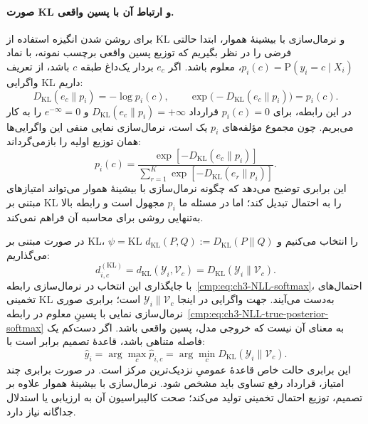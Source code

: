 \label{cmp:subsec:ch3-NLL-definition}
\paragraph{صورت KL و ارتباط آن با پسین واقعی.}
برای روشن شدن انگیزه استفاده از KL و نرمال‌سازی با بیشینهٔ هموار، ابتدا حالتی فرضی را در نظر بگیریم که توزیع پسین واقعی برچسب نمونه، با نماد $p_i(c)=\mathrm P(y_i=c\mid X_i)$، معلوم باشد. اگر $e_c$ بردار یک‌داغ طبقه $c$ باشد، از تعریف واگرایی KL داریم:
\begin{equation}\label{cmp:eq:ch3-NLL-true-posterior-KL}
D_{\mathrm{KL}}(e_c\|p_i)=-\log p_i(c),
\qquad
\exp\bigl(-D_{\mathrm{KL}}(e_c\|p_i)\bigr)=p_i(c).
\end{equation}
در این رابطه، برای $p_i(c)=0$ قرارداد $D_{\mathrm{KL}}(e_c\|p_i)=+\infty$ و $e^{-\infty}=0$ را به کار می‌بریم. چون مجموع مؤلفه‌های $p_i$ یک است، نرمال‌سازی نمایی منفی این واگرایی‌ها همان توزیع اولیه را بازمی‌گرداند:
\begin{equation}\label{cmp:eq:ch3-NLL-true-posterior-softmax}
p_i(c)=
\frac{\exp[-D_{\mathrm{KL}}(e_c\|p_i)]}
{\sum_{r=1}^{K}\exp[-D_{\mathrm{KL}}(e_r\|p_i)]}.
\end{equation}
این برابری توضیح می‌دهد که چگونه نرمال‌سازی با بیشینهٔ هموار می‌تواند امتیازهای مبتنی بر KL را به احتمال تبدیل کند؛ اما در مسئله ما $p_i$ مجهول است و رابطه بالا به‌تنهایی روشی برای محاسبه آن فراهم نمی‌کند.

در صورت مبتنی بر KL، $\psi=\mathrm{KL}$ را انتخاب می‌کنیم و
$d_{\mathrm{KL}}(P,Q):=D_{\mathrm{KL}}(P\|Q)$ می‌گذاریم:
\begin{equation}\label{cmp:eq:ch3-NLL-distance}
d_{i,c}^{(\mathrm{KL})}=d_{\mathrm{KL}}(\mathscr Y_i,\mathcal V_c)
=D_{\mathrm{KL}}(\mathscr Y_i\|\mathcal V_c).
\end{equation}
با جایگذاری این انتخاب در نرمال‌سازی
رابطه~\eqref{cmp:eq:ch3-NLL-softmax}،
احتمال‌های تخمینی KL به‌دست می‌آیند.
جهت واگرایی در اینجا $\mathscr Y_i\|\mathcal V_c$ است؛
برابری صوری نرمال‌سازی نمایی با پسینِ معلوم در
رابطه~\eqref{cmp:eq:ch3-NLL-true-posterior-softmax}
به معنای آن نیست که خروجی مدل، پسین واقعی باشد.
اگر دست‌کم یک فاصله متناهی باشد، قاعدهٔ تصمیم برابر است با:
\begin{equation}\label{cmp:eq:ch3-estimated-label-from-neighborhood}
\boxed{
\widehat y_i
=\arg\max_{c}\widehat p_{i,c}
=\arg\min_{c}D_{\mathrm{KL}}(\mathscr Y_i\|\mathcal V_c).
}
\end{equation}
این برابری حالت خاص قاعدهٔ عمومیِ نزدیک‌ترین مرکز است.
در صورت برابری چند امتیاز، قرارداد رفع تساوی باید مشخص شود.
نرمال‌سازی با بیشینهٔ هموار علاوه بر تصمیم، توزیع احتمال
تخمینی تولید می‌کند؛ صحت کالیبراسیون آن
به ارزیابی یا استدلال جداگانه نیاز دارد.

